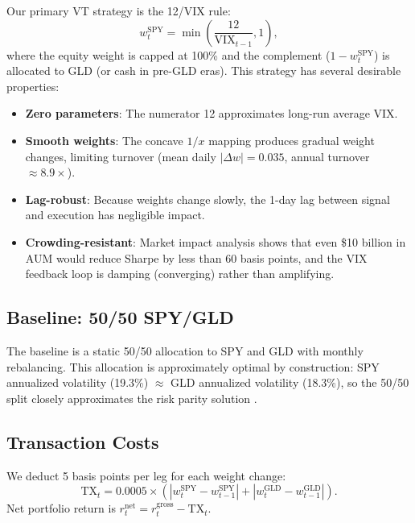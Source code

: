 \documentclass[12pt,a4paper]{article}
\begin{document}
Our primary VT strategy is the 12/VIX rule:
\begin{equation}
w_t^{\text{SPY}} = \min\left(\frac{12}{\text{VIX}_{t-1}}, 1\right),
\label{eq:12vix}
\end{equation}
where the equity weight is capped at 100\% and the complement ($1 - w_t^{\text{SPY}}$) is allocated to GLD (or cash in pre-GLD eras). This strategy has several desirable properties:
\begin{itemize}
    \item \textbf{Zero parameters}: The numerator 12 approximates long-run average VIX.
    \item \textbf{Smooth weights}: The concave $1/x$ mapping produces gradual weight changes, limiting turnover (mean daily $|\Delta w| = 0.035$, annual turnover $\approx 8.9\times$).
    \item \textbf{Lag-robust}: Because weights change slowly, the 1-day lag between signal and execution has negligible impact.
    \item \textbf{Crowding-resistant}: Market impact analysis shows that even \$10 billion in AUM would reduce Sharpe by less than 60 basis points, and the VIX feedback loop is damping (converging) rather than amplifying.
\end{itemize}

\subsection{Baseline: 50/50 SPY/GLD}

The baseline is a static 50/50 allocation to SPY and GLD with monthly rebalancing. This allocation is approximately optimal by construction: SPY annualized volatility (19.3\%) $\approx$ GLD annualized volatility (18.3\%), so the 50/50 split closely approximates the risk parity solution \citep{maillard2010}.

\subsection{Transaction Costs}

We deduct 5 basis points per leg for each weight change:
\begin{equation}
\text{TX}_t = 0.0005 \times \left(|w_t^{\text{SPY}} - w_{t-1}^{\text{SPY}}| + |w_t^{\text{GLD}} - w_{t-1}^{\text{GLD}}|\right).
\label{eq:tx}
\end{equation}
Net portfolio return is $r_t^{\text{net}} = r_t^{\text{gross}} - \text{TX}_t$.
\end{document}
